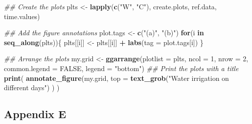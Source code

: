 \documentclass[
]{article}
\newenvironment{Shaded}{\begin{snugshade}}{\end{snugshade}}
\newcommand{\CommentTok}[1]{\textcolor[rgb]{0.56,0.35,0.01}{\textit{#1}}}
\newcommand{\ControlFlowTok}[1]{\textcolor[rgb]{0.13,0.29,0.53}{\textbf{#1}}}
\newcommand{\DataTypeTok}[1]{\textcolor[rgb]{0.13,0.29,0.53}{#1}}
\newcommand{\DecValTok}[1]{\textcolor[rgb]{0.00,0.00,0.81}{#1}}
\newcommand{\KeywordTok}[1]{\textcolor[rgb]{0.13,0.29,0.53}{\textbf{#1}}}
\newcommand{\NormalTok}[1]{#1}
\newcommand{\OperatorTok}[1]{\textcolor[rgb]{0.81,0.36,0.00}{\textbf{#1}}}
\newcommand{\OtherTok}[1]{\textcolor[rgb]{0.56,0.35,0.01}{#1}}
\newcommand{\StringTok}[1]{\textcolor[rgb]{0.31,0.60,0.02}{#1}}
\begin{document}
\begin{Shaded}
\begin{Highlighting}[numbers=left,,]
\CommentTok{\#\# Create the plots}
\NormalTok{plts \textless{}{-}}\StringTok{ }\KeywordTok{lapply}\NormalTok{(}\KeywordTok{c}\NormalTok{(}\StringTok{"W"}\NormalTok{, }\StringTok{"C"}\NormalTok{), create.plots, ref.data, time.values)}

\CommentTok{\#\# Add the figure annotations}
\NormalTok{plot.tags \textless{}{-}}\StringTok{ }\KeywordTok{c}\NormalTok{(}\StringTok{"(a)"}\NormalTok{, }\StringTok{"(b)"}\NormalTok{)}
\ControlFlowTok{for}\NormalTok{(i }\ControlFlowTok{in} \KeywordTok{seq\_along}\NormalTok{(plts))\{}
\NormalTok{  plts[[i]] \textless{}{-}}\StringTok{ }\NormalTok{plts[[i]] }\OperatorTok{+}\StringTok{ }\KeywordTok{labs}\NormalTok{(}\DataTypeTok{tag =}\NormalTok{ plot.tags[i])}
\NormalTok{\}}

\CommentTok{\#\# Arrange the plots}
\NormalTok{my.grid \textless{}{-}}\StringTok{ }\KeywordTok{ggarrange}\NormalTok{(}\DataTypeTok{plotlist =}\NormalTok{ plts, }\DataTypeTok{ncol =} \DecValTok{1}\NormalTok{, }\DataTypeTok{nrow =} \DecValTok{2}\NormalTok{,}
                     \DataTypeTok{common.legend =} \OtherTok{FALSE}\NormalTok{, }\DataTypeTok{legend =} \StringTok{"bottom"}\NormalTok{)}
\CommentTok{\#\# Print the plots with a title}
\KeywordTok{print}\NormalTok{( }\KeywordTok{annotate\_figure}\NormalTok{(my.grid,}
                       \DataTypeTok{top =} \KeywordTok{text\_grob}\NormalTok{(}\StringTok{"Water irrigation on different days"}\NormalTok{) ) )}
\end{Highlighting}
\end{Shaded}

\hypertarget{appendix-e}{%
\subsection{Appendix E}\label{appendix-e}}
\end{document}

